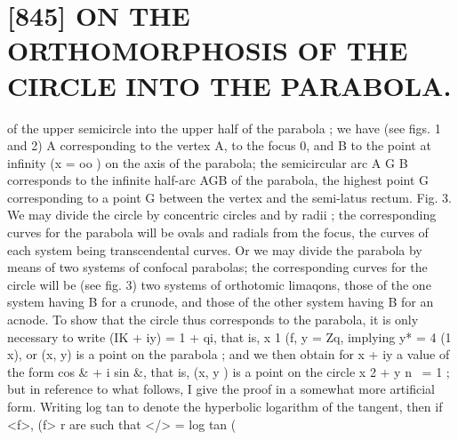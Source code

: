 \documentclass[11pt,a4paper]{book}
\begin{document}
\vspace{1em}

\section*{[845] ON THE ORTHOMORPHOSIS OF THE CIRCLE INTO THE PARABOLA.}


of the upper semicircle into the upper half of the parabola ; we have (see figs. 1 and 2) A corresponding to the vertex A, to the focus 0, and B to the point at infinity (x = oo ) on the axis of the parabola; the semicircular arc A G B corresponds to the infinite half-arc AGB of the parabola, the highest point G corresponding to a point G between the vertex and the semi-latus rectum. Fig. 3. We may divide the circle by concentric circles and by radii ; the corresponding curves for the parabola will be ovals and radials from the focus, the curves of each system being transcendental curves. Or we may divide the parabola by means of two systems of confocal parabolas; the corresponding curves for the circle will be (see fig. 3) two systems of orthotomic limaqons, those of the one system having B for a crunode, and those of the other system having B for an acnode. To show that the circle thus corresponds to the parabola, it is only necessary to write \/(IK + iy) = 1 + qi, that is, x 1 (f, y = Zq, implying y* = 4 (1 x), or (x, y) is a point on the parabola ; and we then obtain for x + iy a value of the form cos & + i sin &, that is, (x, y ) is a point on the circle x 2 + y n~ = 1 ; but in reference to what follows, I give the proof in a somewhat more artificial form. Writing log tan to denote the hyperbolic logarithm of the tangent, then if <f>, (f> r are such that </> = log tan (%
\end{document}
